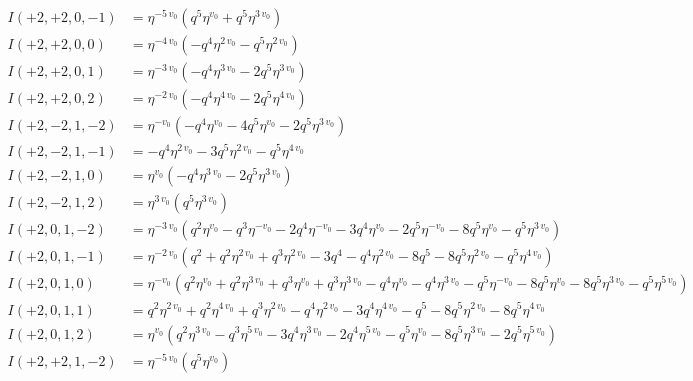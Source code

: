 \documentclass[11pt,a4paper]{article}
\begin{document}
\begin{align*}
I(+2, +2, 0, -1) &= \eta^{-5 \, v_{0}} \left( q^{5} \eta^{v_{0}} + q^{5} \eta^{3 \, v_{0}} \right) \\
I(+2, +2, 0, 0) &= \eta^{-4 \, v_{0}} \left( -q^{4} \eta^{2 \, v_{0}} - q^{5} \eta^{2 \, v_{0}} \right) \\
I(+2, +2, 0, 1) &= \eta^{-3 \, v_{0}} \left( -q^{4} \eta^{3 \, v_{0}} - 2 q^{5} \eta^{3 \, v_{0}} \right) \\
I(+2, +2, 0, 2) &= \eta^{-2 \, v_{0}} \left( -q^{4} \eta^{4 \, v_{0}} - 2 q^{5} \eta^{4 \, v_{0}} \right) \\
I(+2, -2, 1, -2) &= \eta^{-v_{0}} \left( -q^{4} \eta^{v_{0}} - 4 q^{5} \eta^{v_{0}} - 2 q^{5} \eta^{3 \, v_{0}} \right) \\
I(+2, -2, 1, -1) &= -q^{4} \eta^{2 \, v_{0}} - 3 q^{5} \eta^{2 \, v_{0}} - q^{5} \eta^{4 \, v_{0}} \\
I(+2, -2, 1, 0) &= \eta^{v_{0}} \left( -q^{4} \eta^{3 \, v_{0}} - 2 q^{5} \eta^{3 \, v_{0}} \right) \\
I(+2, -2, 1, 2) &= \eta^{3 \, v_{0}} \left( q^{5} \eta^{3 \, v_{0}} \right) \\
I(+2, 0, 1, -2) &= \eta^{-3 \, v_{0}} \left( q^{2} \eta^{v_{0}} - q^{3} \eta^{-v_{0}} - 2 q^{4} \eta^{-v_{0}} - 3 q^{4} \eta^{v_{0}} - 2 q^{5} \eta^{-v_{0}} - 8 q^{5} \eta^{v_{0}} - q^{5} \eta^{3 \, v_{0}} \right) \\
I(+2, 0, 1, -1) &= \eta^{-2 \, v_{0}} \left( q^{2} + q^{2} \eta^{2 \, v_{0}} + q^{3} \eta^{2 \, v_{0}} - 3 q^{4} - q^{4} \eta^{2 \, v_{0}} - 8 q^{5} - 8 q^{5} \eta^{2 \, v_{0}} - q^{5} \eta^{4 \, v_{0}} \right) \\
I(+2, 0, 1, 0) &= \eta^{-v_{0}} \left( q^{2} \eta^{v_{0}} + q^{2} \eta^{3 \, v_{0}} + q^{3} \eta^{v_{0}} + q^{3} \eta^{3 \, v_{0}} - q^{4} \eta^{v_{0}} - q^{4} \eta^{3 \, v_{0}} - q^{5} \eta^{-v_{0}} - 8 q^{5} \eta^{v_{0}} - 8 q^{5} \eta^{3 \, v_{0}} - q^{5} \eta^{5 \, v_{0}} \right) \\
I(+2, 0, 1, 1) &= q^{2} \eta^{2 \, v_{0}} + q^{2} \eta^{4 \, v_{0}} + q^{3} \eta^{2 \, v_{0}} - q^{4} \eta^{2 \, v_{0}} - 3 q^{4} \eta^{4 \, v_{0}} - q^{5} - 8 q^{5} \eta^{2 \, v_{0}} - 8 q^{5} \eta^{4 \, v_{0}} \\
I(+2, 0, 1, 2) &= \eta^{v_{0}} \left( q^{2} \eta^{3 \, v_{0}} - q^{3} \eta^{5 \, v_{0}} - 3 q^{4} \eta^{3 \, v_{0}} - 2 q^{4} \eta^{5 \, v_{0}} - q^{5} \eta^{v_{0}} - 8 q^{5} \eta^{3 \, v_{0}} - 2 q^{5} \eta^{5 \, v_{0}} \right) \\
I(+2, +2, 1, -2) &= \eta^{-5 \, v_{0}} \left( q^{5} \eta^{v_{0}} \right) \\

\end{align*}
\end{document}

